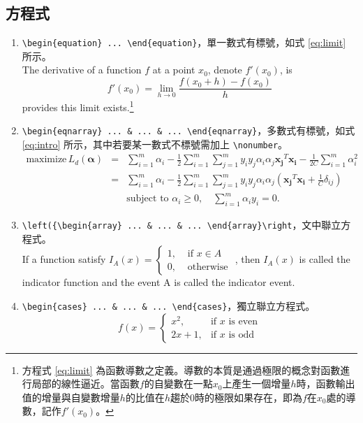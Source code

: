 \subsection{方程式}
\begin{enumerate}
\item 
\verb|\begin{equation} ... \end{equation}|，單一數式有標號，如式 \ref{eq:limit} 所示。\\
The derivative of a function $f$ at a point $x_0$, denote $f'(x_0)$, is
\begin{equation}\label{eq:limit}
f'(x_0) = \lim_{h \rightarrow 0} \frac{f(x_0 + h) - f(x_0)}{h}
\end{equation}
provides this limit exists.\footnote{方程式 \ref{eq:limit} 為函數導數之定義。導數的本質是通過極限的概念對函數進行局部的線性逼近。當函數$f$的自變數在一點$x_0$上產生一個增量$h$時，函數輸出值的增量與自變數增量$h$的比值在$h$趨於$0$時的極限如果存在，即為$f$在$x_0$處的導數，記作$f'(x_0)$。}
\item
\verb|\begin{eqnarray} ... & ... & ... \end{eqnarray}|，多數式有標號，如式 \ref{eq:intro} 所示，其中若要某一數式不標號需加上 \verb|\nonumber|。\\
\begin{eqnarray}\label{eq:intro}
\text{maximize}\,L_d(\boldsymbol{\alpha}) & = & \sum_{i = 1}^m \alpha_i - \frac{1}{2} \sum_{i = 1}^m\sum_{j = 1}^m y_i y_j \alpha_i \alpha_j \mathbf{x_j}^T \mathbf{x_i} - \frac{1}{2C}\sum_{i = 1}^m \alpha_i^2 \nonumber \\
& = & \sum_{i = 1}^m \alpha_i - \frac{1}{2} \sum_{i = 1}^m\sum_{j = 1}^m y_i y_j \alpha_i \alpha_j (\mathbf{x_j}^T \mathbf{x_i} + \frac{1}{C}\delta_{ij})\\
&   & \text{subject to}\,\,\alpha_i \ge 0, \quad \sum_{i = 1}^m \alpha_i y_i = 0. \nonumber	
\end{eqnarray}
\item
\verb|\left({\begin{array} ... & ... & ... \end{array}\right|，文中聯立方程式。\\
\vspace{0.2cm}
If a function satisfy $I_A(x) = 
\left\{\begin{array}{ll} 
1, & \,\, \mbox{if }x \in A\\ 
0, & \,\, \mbox{otherwise} 
\end{array}\right.$
, then $I_A(x)$ is called the\\
\vspace{0.3cm}
indicator function and the event A is called the indicator event.
\item
\verb|\begin{cases} ... & ... & ... \end{cases}|，獨立聯立方程式。
\[f(x) = \begin{cases} 
x^2,  & \mbox{if }x\mbox{ is even} \\ 
2x+1, & \mbox{if }x\mbox{ is odd} 
\end{cases}\]
\end{enumerate}\bigskip
